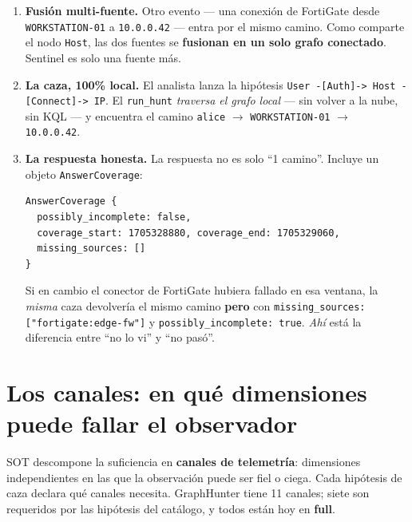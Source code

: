 \documentclass[11pt,a4paper]{article}
\newcommand{\term}[1]{\textcolor{ghblue}{\textbf{#1}}}
\newcommand{\code}[1]{\texttt{\small #1}}
\begin{document}
\begin{enumerate}[leftmargin=*,itemsep=6pt]
  \item[\textbf{Paso 5.}] \term{Fusión multi-fuente.} Otro evento --- una
  conexión de FortiGate desde \code{WORKSTATION-01} a \code{10.0.0.42} ---
  entra por el mismo camino. Como comparte el nodo \code{Host}, las dos fuentes
  se \textbf{fusionan en un solo grafo conectado}. Sentinel es solo una fuente
  más.

  \item[\textbf{Paso 6.}] \term{La caza, 100\% local.} El analista lanza la
  hipótesis \code{User -[Auth]-> Host -[Connect]-> IP}. El \code{run\_hunt}
  \emph{traversa el grafo local} --- sin volver a la nube, sin KQL --- y
  encuentra el camino \code{alice} $\to$ \code{WORKSTATION-01} $\to$
  \code{10.0.0.42}.

  \item[\textbf{Paso 7.}] \term{La respuesta honesta.} La respuesta no es solo
  ``1 camino''. Incluye un objeto \code{AnswerCoverage}:
\begin{lstlisting}
AnswerCoverage {
  possibly_incomplete: false,
  coverage_start: 1705328880, coverage_end: 1705329060,
  missing_sources: []
}
\end{lstlisting}
  Si en cambio el conector de FortiGate hubiera fallado en esa ventana, la
  \emph{misma} caza devolvería el mismo camino \textbf{pero} con
  \code{missing\_sources: ["fortigate:edge-fw"]} y
  \code{possibly\_incomplete: true}. \emph{Ahí} está la diferencia entre
  ``no lo vi'' y ``no pasó''.
\end{enumerate}

\section{Los canales: en qué dimensiones puede fallar el observador}

SOT descompone la suficiencia en \term{canales de telemetría}: dimensiones
independientes en las que la observación puede ser fiel o ciega. Cada hipótesis
de caza declara qué canales necesita. GraphHunter tiene 11 canales; siete son
requeridos por las hipótesis del catálogo, y todos están hoy en \textbf{full}.
\end{document}
